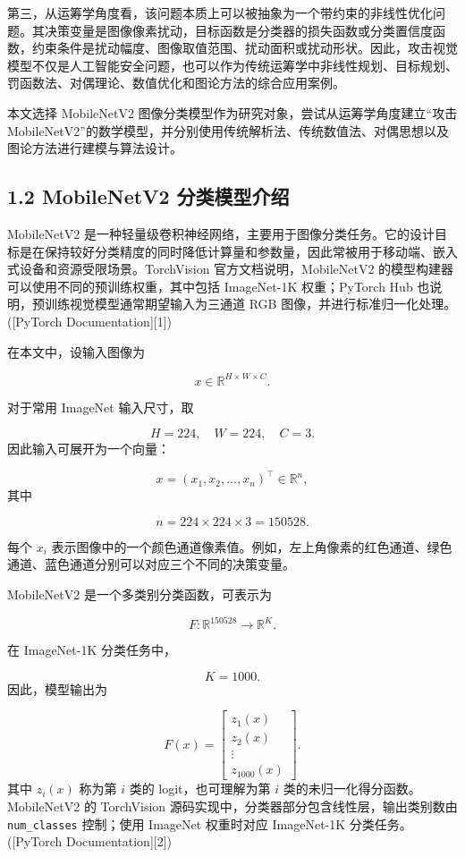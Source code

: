 ﻿\documentclass[UTF8,zihao=-4,fontset=none]{ctexart}
\begin{document}
第三，从运筹学角度看，该问题本质上可以被抽象为一个带约束的非线性优化问题。其决策变量是图像像素扰动，目标函数是分类器的损失函数或分类置信度函数，约束条件是扰动幅度、图像取值范围、扰动面积或扰动形状。因此，攻击视觉模型不仅是人工智能安全问题，也可以作为传统运筹学中非线性规划、目标规划、罚函数法、对偶理论、数值优化和图论方法的综合应用案例。

本文选择 MobileNetV2 图像分类模型作为研究对象，尝试从运筹学角度建立“攻击 MobileNetV2”的数学模型，并分别使用传统解析法、传统数值法、对偶思想以及图论方法进行建模与算法设计。

\subsection*{1.2 MobileNetV2 分类模型介绍}
{}

MobileNetV2 是一种轻量级卷积神经网络，主要用于图像分类任务。它的设计目标是在保持较好分类精度的同时降低计算量和参数量，因此常被用于移动端、嵌入式设备和资源受限场景。TorchVision 官方文档说明，MobileNetV2 的模型构建器可以使用不同的预训练权重，其中包括 ImageNet-1K 权重；PyTorch Hub 也说明，预训练视觉模型通常期望输入为三通道 RGB 图像，并进行标准归一化处理。([PyTorch Documentation][1])

在本文中，设输入图像为

\[
x\in \mathbb{R}^{H\times W\times C}.
\]

对于常用 ImageNet 输入尺寸，取

\[
H=224,\quad W=224,\quad C=3.
\]
\noindent 因此输入可展开为一个向量：

\[
x=(x_1,x_2,\ldots,x_n)^\top\in\mathbb{R}^n,
\]
\noindent 其中

\[
n=224\times 224\times 3=150528.
\]

每个 \(x_i\) 表示图像中的一个颜色通道像素值。例如，左上角像素的红色通道、绿色通道、蓝色通道分别可以对应三个不同的决策变量。

MobileNetV2 是一个多类别分类函数，可表示为

\[
F:\mathbb{R}^{150528}\rightarrow \mathbb{R}^{K}.
\]

在 ImageNet-1K 分类任务中，

\[
K=1000.
\]
\noindent 因此，模型输出为

\[
F(x)=
\begin{bmatrix}
z_1(x)\\
z_2(x)\\
\vdots\\
z_{1000}(x)
\end{bmatrix}.
\]
\noindent 其中 \(z_i(x)\) 称为第 \(i\) 类的 logit，也可理解为第 \(i\) 类的未归一化得分函数。MobileNetV2 的 TorchVision 源码实现中，分类器部分包含线性层，输出类别数由 \texttt{num\_classes} 控制；使用 ImageNet 权重时对应 ImageNet-1K 分类任务。([PyTorch Documentation][2])
\end{document}
